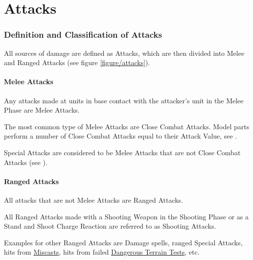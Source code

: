 \part{Attacks}
\label{attacks}

\section{Definition and Classification of Attacks}

All sources of damage are defined as Attacks, which are then divided into Melee and Ranged Attacks (see figure \ref{figure/attacks}).

\subsection{Melee Attacks}
\label{melee_attacks}

Any attacks made at units in base contact with the attacker's unit in the Melee Phase are Melee Attacks.

The most common type of Melee Attacks are Close Combat Attacks. Model parts perform a number of Close Combat Attacks equal to their Attack Value, see .

Special Attacks are considered to be Melee Attacks that are not Close Combat Attacks (see ).

\subsection{Ranged Attacks}
\label{ranged_attacks}

All attacks that are not Melee Attacks are Ranged Attacks.

All Ranged Attacks made with a Shooting Weapon in the Shooting Phase or as a Stand and Shoot Charge Reaction are referred to as Shooting Attacks.

Examples for other Ranged Attacks are Damage spells, ranged Special Attacks, hits from \hyperref[miscast]{Miscasts}, hits from failed \hyperref[dangerous_terrain]{Dangerous Terrain Tests}, etc.

